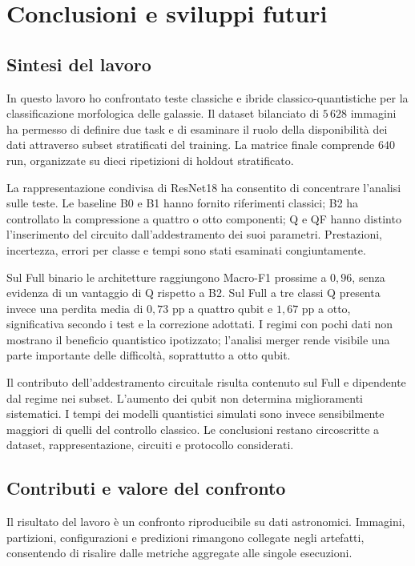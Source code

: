 \chapter{Conclusioni e sviluppi futuri}
\label{chap:conclusioni}

\section{Sintesi del lavoro}

In questo lavoro ho confrontato teste classiche e ibride
classico-quantistiche per la classificazione morfologica delle galassie.
Il dataset bilanciato di \(5\,628\) immagini ha permesso di definire due task e di
esaminare il ruolo della disponibilità dei dati attraverso subset
stratificati del training. La matrice finale comprende \(640\) run,
organizzate su dieci ripetizioni di holdout stratificato.

La rappresentazione condivisa di ResNet18 ha consentito di
concentrare l'analisi sulle teste. Le baseline B0 e B1 hanno
fornito riferimenti classici; B2 ha controllato la compressione
a quattro o otto componenti; Q e QF hanno distinto l'inserimento
del circuito dall'addestramento dei suoi parametri. Prestazioni,
incertezza, errori per classe e tempi sono stati esaminati
congiuntamente.

Sul Full binario le architetture raggiungono Macro-F1 prossime
a \(0{,}96\), senza evidenza di un vantaggio di Q rispetto a B2.
Sul Full a tre classi Q presenta invece una perdita media di
\(0{,}73\) pp a quattro qubit e \(1{,}67\) pp a otto,
significativa secondo i test e la correzione adottati. I regimi
con pochi dati non mostrano il beneficio quantistico ipotizzato;
l'analisi merger rende visibile una parte importante delle
difficoltà, soprattutto a otto qubit.

Il contributo dell'addestramento circuitale risulta contenuto
sul Full e dipendente dal regime nei subset. L'aumento dei qubit
non determina miglioramenti sistematici. I tempi dei modelli
quantistici simulati sono invece sensibilmente maggiori di quelli
del controllo classico.
Le conclusioni restano circoscritte a dataset, rappresentazione,
circuiti e protocollo considerati.

\section{Contributi e valore del confronto}

Il risultato del lavoro è un confronto riproducibile su dati
astronomici. Immagini, partizioni, configurazioni e predizioni
rimangono collegate negli artefatti, consentendo di risalire
dalle metriche aggregate alle singole esecuzioni.

